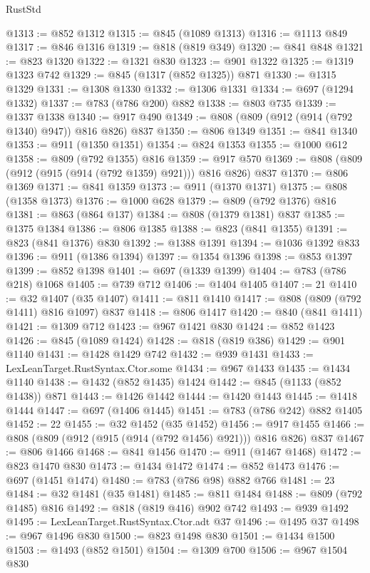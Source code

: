 \begin{lexlean}{RustStd}
\begin{coremodule}
@1313 := @852 @1312
@1315 := @845 (@1089 @1313)
@1316 := @1113 @849
@1317 := @846 @1316
@1319 := @818 (@819 @349)
@1320 := @841 @848
@1321 := @823 @1320
@1322 := @1321 @830
@1323 := @901 @1322
@1325 := @1319 @1323 @742
@1329 := @845 (@1317 (@852 @1325)) @871
@1330 := @1315 @1329
@1331 := @1308 @1330
@1332 := @1306 @1331
@1334 := @697 (@1294 @1332)
@1337 := @783 (@786 @200) @882
@1338 := @803 @735
@1339 := @1337 @1338
@1340 := @917 @490
@1349 := @808 (@809 (@912 (@914 (@792 @1340) @947)) @816 @826) @837
@1350 := @806 @1349
@1351 := @841 @1340
@1353 := @911 (@1350 @1351)
@1354 := @824 @1353
@1355 := @1000 @612
@1358 := @809 (@792 @1355) @816
@1359 := @917 @570
@1369 := @808 (@809 (@912 (@915 (@914 (@792 @1359) @921))) @816 @826) @837
@1370 := @806 @1369
@1371 := @841 @1359
@1373 := @911 (@1370 @1371)
@1375 := @808 (@1358 @1373)
@1376 := @1000 @628
@1379 := @809 (@792 @1376) @816
@1381 := @863 (@864 @137)
@1384 := @808 (@1379 @1381) @837
@1385 := @1375 @1384
@1386 := @806 @1385
@1388 := @823 (@841 @1355)
@1391 := @823 (@841 @1376) @830
@1392 := @1388 @1391
@1394 := @1036 @1392 @833
@1396 := @911 (@1386 @1394)
@1397 := @1354 @1396
@1398 := @853 @1397
@1399 := @852 @1398
@1401 := @697 (@1339 @1399)
@1404 := @783 (@786 @218) @1068
@1405 := @739 @712
@1406 := @1404 @1405
@1407 := 21
@1410 := @32 @1407 (@35 @1407)
@1411 := @811 @1410
@1417 := @808 (@809 (@792 @1411) @816 @1097) @837
@1418 := @806 @1417
@1420 := @840 (@841 @1411)
@1421 := @1309 @712
@1423 := @967 @1421 @830
@1424 := @852 @1423
@1426 := @845 (@1089 @1424)
@1428 := @818 (@819 @386)
@1429 := @901 @1140
@1431 := @1428 @1429 @742
@1432 := @939 @1431
@1433 := LexLeanTarget.RustSyntax.Ctor.some
@1434 := @967 @1433
@1435 := @1434 @1140
@1438 := @1432 (@852 @1435) @1424
@1442 := @845 (@1133 (@852 @1438)) @871
@1443 := @1426 @1442
@1444 := @1420 @1443
@1445 := @1418 @1444
@1447 := @697 (@1406 @1445)
@1451 := @783 (@786 @242) @882 @1405
@1452 := 22
@1455 := @32 @1452 (@35 @1452)
@1456 := @917 @1455
@1466 := @808 (@809 (@912 (@915 (@914 (@792 @1456) @921))) @816 @826) @837
@1467 := @806 @1466
@1468 := @841 @1456
@1470 := @911 (@1467 @1468)
@1472 := @823 @1470 @830
@1473 := @1434 @1472
@1474 := @852 @1473
@1476 := @697 (@1451 @1474)
@1480 := @783 (@786 @98) @882 @766
@1481 := 23
@1484 := @32 @1481 (@35 @1481)
@1485 := @811 @1484
@1488 := @809 (@792 @1485) @816
@1492 := @818 (@819 @416) @902 @742
@1493 := @939 @1492
@1495 := LexLeanTarget.RustSyntax.Ctor.adt @37
@1496 := @1495 @37
@1498 := @967 @1496 @830
@1500 := @823 @1498 @830
@1501 := @1434 @1500
@1503 := @1493 (@852 @1501)
@1504 := @1309 @700
@1506 := @967 @1504 @830

\end{coremodule}
\end{lexlean}
